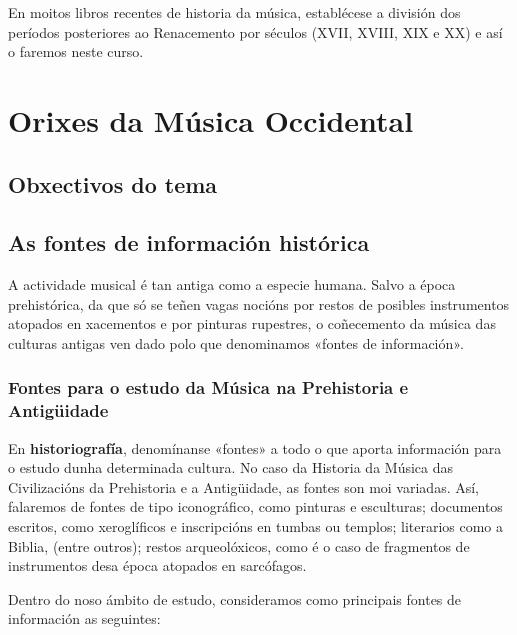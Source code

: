 \documentclass[a4paper, twoside]{templates/ociamthesis}
\begin{document}
En moitos libros recentes de historia da música, establécese a división dos períodos posteriores ao Renacemento por séculos (XVII, XVIII, XIX e XX) e así o faremos neste curso.

\hypertarget{orixes-da-muxfasica-occidental}{%
\chapter{Orixes da Música Occidental}\label{orixes-da-muxfasica-occidental}}

\minitoc 

\hypertarget{obxectivos-do-tema}{%
\section{Obxectivos do tema}\label{obxectivos-do-tema}}

\hypertarget{as-fontes-de-informaciuxf3n-histuxf3rica}{%
\section{As fontes de información histórica}\label{as-fontes-de-informaciuxf3n-histuxf3rica}}

A actividade musical é tan antiga como a especie humana. Salvo a época prehistórica, da que só se teñen vagas nocións por restos de posibles instrumentos atopados en xacementos e por pinturas rupestres, o coñecemento da música das culturas antigas ven dado polo que denominamos «fontes de información».

\hypertarget{fontes-para-o-estudo-da-muxfasica-na-prehistoria-e-antiguxfcidade}{%
\subsection{Fontes para o estudo da Música na Prehistoria e Antigüidade}\label{fontes-para-o-estudo-da-muxfasica-na-prehistoria-e-antiguxfcidade}}

En \textbf{historiografía}, denomínanse «fontes» a todo o que aporta información para o estudo dunha determinada cultura. No caso da Historia da Música das Civilizacións da Prehistoria e a Antigüidade, as fontes son moi variadas. Así, falaremos de fontes de tipo iconográfico, como pinturas e esculturas; documentos escritos, como xeroglíficos e inscripcións en tumbas ou templos; literarios como a Biblia, (entre outros); restos arqueolóxicos, como é o caso de fragmentos de instrumentos desa época atopados en sarcófagos.

Dentro do noso ámbito de estudo, consideramos como principais fontes de información as seguintes:
\end{document}
